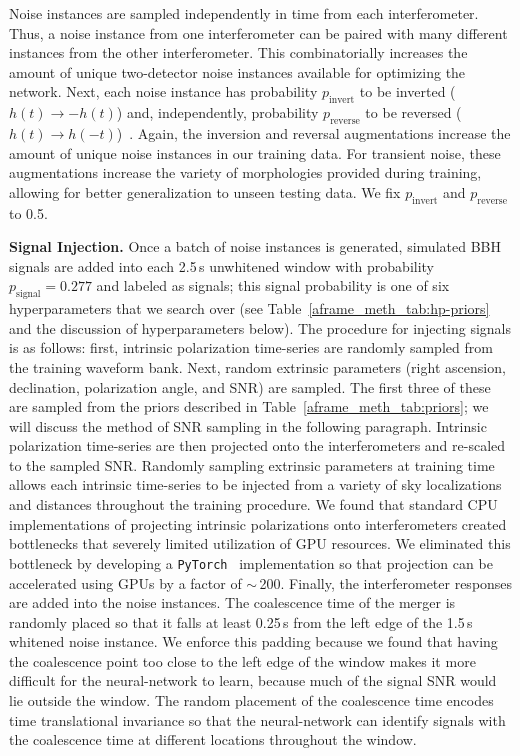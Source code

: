 \begin{refsection}
Noise instances are sampled independently in time from each interferometer.
Thus, a noise instance from one interferometer can be paired with many different instances from the other interferometer.
This combinatorially increases the amount of unique two-detector noise instances available for optimizing the network. 
Next, each noise instance has probability $p_{\text{invert}}$ to be inverted ($h(t) \rightarrow -h(t)$) and, independently, probability $p_{\text{reverse}}$ to be reversed ($h(t) \rightarrow h(-t)$)~\cite{Bini_2023}.
Again, the inversion and reversal augmentations increase the amount of unique noise instances in our training data.
For transient noise, these augmentations increase the variety of morphologies provided during training, allowing for better generalization to unseen testing data. 
We fix $p_{\text{invert}}$ and $p_{\text{reverse}}$ to 0.5.

\textbf{Signal Injection.} \label{aframe_meth_sec:signal-injections}
Once a batch of noise instances is generated, simulated BBH signals are added into each 2.5\,s unwhitened window with probability $p_{\text{signal}} = 0.277$ and labeled as signals; this signal probability is one of six hyperparameters that we search over (see Table~\ref{aframe_meth_tab:hp-priors} and the discussion of hyperparameters below). 
The procedure for injecting signals is as follows: first, intrinsic polarization time-series are randomly sampled from the training waveform bank. 
Next, random extrinsic parameters (right ascension, declination, polarization angle, and SNR) are sampled. 
The first three of these are sampled from the priors described in Table~\ref{aframe_meth_tab:priors}; we will discuss the method of SNR sampling in the following paragraph.
Intrinsic polarization time-series are then projected onto the interferometers and re-scaled to the sampled SNR. 
Randomly sampling extrinsic parameters at training time allows each intrinsic time-series to be injected from a variety of sky localizations and distances throughout the training procedure. 
We found that standard CPU implementations of projecting intrinsic polarizations onto interferometers created bottlenecks that severely limited utilization of GPU resources. 
We eliminated this bottleneck by developing a \texttt{PyTorch}~\cite{10.5555/3454287.3455008} implementation so that projection can be accelerated using GPUs by a factor of $\sim$\,200.
Finally, the interferometer responses are added into the noise instances.
The coalescence time of the merger is randomly placed so that it falls at least 0.25\,s from the left edge of the 1.5\,s whitened noise instance.
We enforce this padding because we found that having the coalescence point too close to the left edge of the window makes it more difficult for the neural-network to learn, because much of the signal SNR would lie outside the window.
The random placement of the coalescence time encodes time translational invariance so that the neural-network can identify signals with the coalescence time at different locations throughout the window.


\end{refsection}
